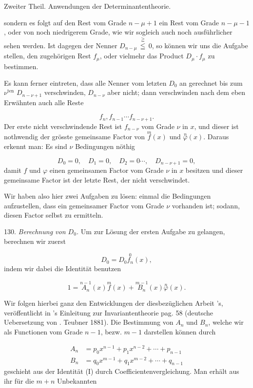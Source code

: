 \documentclass[11pt]{article}
\providecommand{\gesperrt}[1]{\textls[130]{#1}}
\providecommand{\weberpage}[1]{}
\providecommand{\weq}[2]{\begin{equation}\tag{#1}#2\end{equation}}
\begin{document}
\weberpage{136}
Zweiter Theil. Anwendungen der Determinantentheorie.

sondern es folgt auf den Rest vom Grade $n-\mu+1$ ein Rest vom
Grade $n-\mu-1$, oder von noch niedrigerem Grade, wie wir sogleich
auch noch ausführlicher sehen werden. Ist dagegen der Nenner
$D_{n-\mu}\,\overset{\geqq}{\leqq}\,0$, so können wir uns die Aufgabe stellen, den zugehörigen
Rest $f_\mu$, oder vielmehr das Product $D_\mu \cdot f_\mu$ zu bestimmen.

Es kann ferner eintreten, dass alle Nenner vom letzten $D_0$ an
gerechnet bis zum $\nu^{\text{ten}}$ $D_{n-\nu+1}$ verschwinden, $D_{n-\nu}$ aber nicht; dann
verschwinden nach dem eben Erwähnten auch alle Reste

\[
f_n, f_{n-1}\cdots f_{n-\nu+1}.
\]
Der erste nicht verschwindende Rest ist $f_{n-\nu}$ vom Grade $\nu$ in $x$, und
dieser ist nothwendig der grösste gemeinsame Factor von $\overset{m}{f}(x)$ und
$\overset{n}{\varphi}(x)$. Daraus erkennt man: Es sind $\nu$ Bedingungen nöthig

\[
D_0 = 0, \quad D_1 = 0, \quad D_2 = 0 \cdots, \quad D_{n-\nu+1} = 0,
\]
damit $f$ und $\varphi$ einen gemeinsamen Factor vom Grade $\nu$ in $x$ besitzen
und dieser gemeinsame Factor ist der letzte Rest, der nicht ver\-schwindet.

Wir haben also hier zwei Aufgaben zu lösen: einmal die Be\-dingungen aufzustellen, dass ein gemeinsamer Factor vom Grade $\nu$
vorhanden ist; sodann, diesen Factor selbst zu ermitteln.

130. \textit{Berechnung von $D_0$.} Um zur Lösung der ersten Aufgabe zu
gelangen, berechnen wir zuerst

\[
D_0 = D_0\overset{0}{f_n}(x),
\]
indem wir dabei die Identität benutzen

\weq{I}{1 = \overset{n-1}{A_n}(x)\overset{m}{f}(x) + \overset{m-1}{B_n}(x)\overset{n}{\varphi}(x).}

Wir folgen hierbei ganz den Entwicklungen der diesbezüglichen Arbeit
\gesperrt{Nöther}'s, veröffentlicht in \gesperrt{Faà di Bruno}'s Einleitung zur Invarianten\-theorie pag. 58 (deutsche Uebersetzung von \gesperrt{Walter}. Teubner 1881).
Die Bestimmung von $A_n$ und $B_n$, welche wir als Functionen vom
Grade $n-1$, bezw. $m-1$ darstellen können durch

\[
\begin{aligned}
A_n &= p_0 x^{n-1} + p_1 x^{n-2} + \cdots + p_{n-1}\\
B_n &= q_0 x^{m-1} + q_1 x^{m-2} + \cdots + q_{n-1}
\end{aligned}
\]
geschieht aus der Identität (I) durch Coefficientenvergleichung. Man
erhält aus ihr für die $m+n$ Unbekannten
\end{document}
